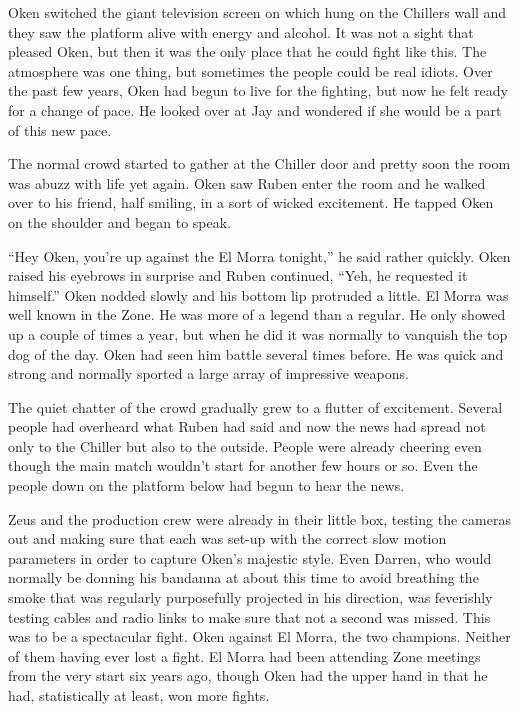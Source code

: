 Oken switched the giant television screen on which hung on the Chillers wall and they saw the platform alive with energy and alcohol.  It was not a sight that pleased Oken, but then it was the only place that he could fight like this.  The atmosphere was one thing, but sometimes the people could be real idiots.  Over the past few years, Oken had begun to live for the fighting, but now he felt ready for a change of pace.  He looked over at Jay and wondered if she would be a part of this new pace.

The normal crowd started to gather at the Chiller door and pretty soon the room was abuzz with life yet again.  Oken saw Ruben enter the room and he walked over to his friend, half smiling, in a sort of wicked excitement.  He tapped Oken on the shoulder and began to speak.  

``Hey Oken, you're up against the El Morra tonight,'' he said rather quickly.  Oken raised his eyebrows in surprise and Ruben continued, ``Yeh, he requested it himself.''  Oken nodded slowly and his bottom lip protruded a little.  El Morra was well known in the Zone.  He was more of a legend than a regular.  He only showed up a couple of times a year, but when he did it was normally to vanquish the top dog of the day.  Oken had seen him battle several times before.  He was quick and strong and normally sported a large array of impressive weapons.  

The quiet chatter of the crowd gradually grew to a flutter of excitement.  Several people had overheard what Ruben had said and now the news had spread not only to the Chiller but also to the outside.  People were already cheering even though the main match wouldn't start for another few hours or so.  Even the people down on the platform below had begun to hear the news.  

Zeus and the production crew were already in their little box, testing the cameras out and making sure that each was set-up with the correct slow motion parameters in order to capture Oken's majestic style.  Even Darren, who would normally be donning his bandanna at about this time to avoid breathing the smoke that was regularly purposefully projected in his direction, was feverishly testing cables and radio links to make sure that not a second was missed.  This was to be a spectacular fight.  Oken against El Morra, the two champions.  Neither of them having ever lost a fight.  El Morra had been attending Zone meetings from the very start six years ago, though Oken had the upper hand in that he had, statistically at least, won more fights.

